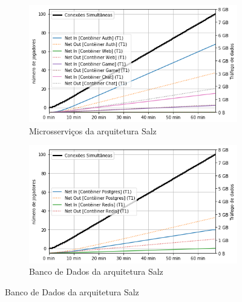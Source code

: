 \begin{figure}[htb!]
    \begin{subfigure}{.5\textwidth}
        \centering
        \includegraphics[width=.95\linewidth]{figuras/testes/s_net_game.png}
        \caption{Microsserviços da arquitetura Salz}
        \label{fig:s_net_game}
    \end{subfigure}%
    \begin{subfigure}{.5\textwidth}
        \centering
        \includegraphics[width=.95\linewidth]{figuras/testes/s_net_db.png}
        \caption{Banco de Dados da arquitetura Salz}
        \label{fig:s_net_db}
    \end{subfigure}%


\end{figure}
